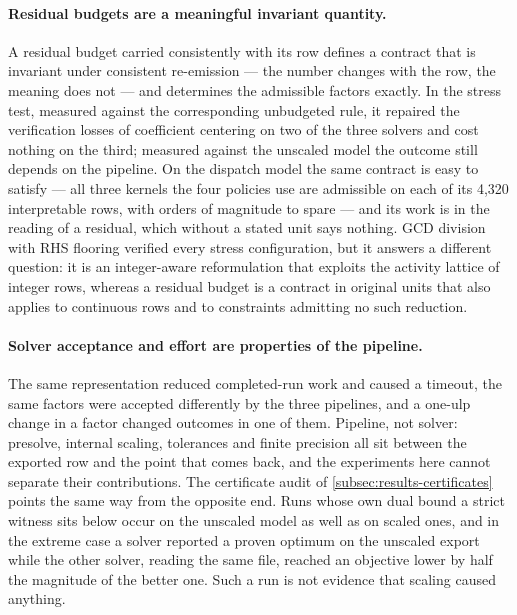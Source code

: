 \documentclass[smallextended,envcountsect,envcountsame]{svjour3}
\begin{document}
\paragraph{Residual budgets are a meaningful invariant quantity.} A residual budget carried
consistently with its row defines a contract that is invariant under consistent re-emission ---
the number changes with the row, the meaning does not --- and determines the admissible factors
exactly. In the
stress test, measured against the corresponding unbudgeted rule, it repaired the verification
losses of coefficient centering on two of the three solvers and cost nothing on the third;
measured against the unscaled model the outcome still depends on the pipeline. On the dispatch
model the same contract is easy to satisfy --- all three kernels the four policies use are
admissible on each of its 4,320 interpretable rows, with orders of magnitude to spare --- and
its work is in the reading of a residual, which without a stated unit says nothing. GCD division with RHS flooring verified every stress configuration, but it
answers a different question: it is an integer-aware reformulation that exploits the activity
lattice of integer rows, whereas a residual budget is a contract in original units that also
applies to continuous rows and to constraints admitting no such reduction.

\paragraph{Solver acceptance and effort are properties of the pipeline.} The same
representation reduced completed-run work and caused a timeout, the same factors were accepted
differently by the three pipelines, and a one-ulp change in a factor changed outcomes in one of
them. Pipeline, not solver: presolve, internal scaling, tolerances and finite precision all sit
between the exported row and the point that comes back, and the experiments here cannot
separate their contributions. The certificate audit of \cref{subsec:results-certificates}
points the same way from the opposite end. Runs whose own dual bound a strict witness sits
below occur on the unscaled model as well as on scaled ones, and in the extreme case a solver
reported a proven optimum on the unscaled export while the other solver, reading the same file,
reached an objective lower by half the magnitude of the better one. Such a run is not evidence
that scaling caused anything.
\end{document}
